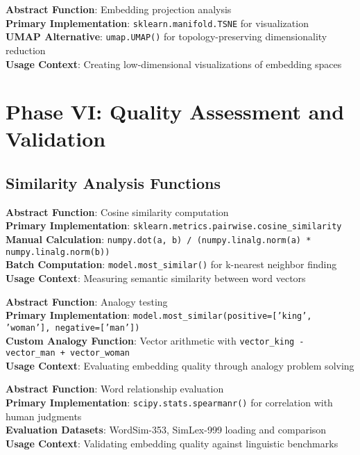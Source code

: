 \documentclass[11pt,a4paper]{article}
\begin{document}
\textbf{Abstract Function}: Embedding projection analysis \\
\textbf{Primary Implementation}: \texttt{sklearn.manifold.TSNE} for visualization \\
\textbf{UMAP Alternative}: \texttt{umap.UMAP()} for topology-preserving dimensionality reduction \\
\textbf{Usage Context}: Creating low-dimensional visualizations of embedding spaces

\section{Phase VI: Quality Assessment and Validation}

\subsection{Similarity Analysis Functions}

\textbf{Abstract Function}: Cosine similarity computation \\
\textbf{Primary Implementation}: \texttt{sklearn.metrics.pairwise.cosine\_similarity} \\
\textbf{Manual Calculation}: \texttt{numpy.dot(a, b) / (numpy.linalg.norm(a) * numpy.linalg.norm(b))} \\
\textbf{Batch Computation}: \texttt{model.most\_similar()} for k-nearest neighbor finding \\
\textbf{Usage Context}: Measuring semantic similarity between word vectors

\textbf{Abstract Function}: Analogy testing \\
\textbf{Primary Implementation}: \texttt{model.most\_similar(positive=['king', 'woman'], negative=['man'])} \\
\textbf{Custom Analogy Function}: Vector arithmetic with \texttt{vector\_king - vector\_man + vector\_woman} \\
\textbf{Usage Context}: Evaluating embedding quality through analogy problem solving

\textbf{Abstract Function}: Word relationship evaluation \\
\textbf{Primary Implementation}: \texttt{scipy.stats.spearmanr()} for correlation with human judgments \\
\textbf{Evaluation Datasets}: WordSim-353, SimLex-999 loading and comparison \\
\textbf{Usage Context}: Validating embedding quality against linguistic benchmarks
\end{document}
